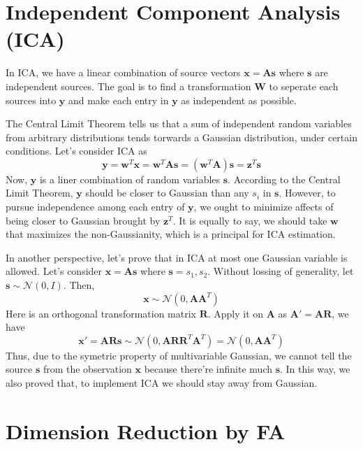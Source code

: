 \documentclass{article}
\begin{document}
\section{Independent Component Analysis (ICA)}
\par
In ICA, we have a linear combination of source vectors $\mathbf{x}=\mathbf{As}$ where $\mathbf{s}$ are independent sources. The goal is to find a transformation $\mathbf{W}$ to seperate each sources into $\mathbf{y}$ and make each entry in $\mathbf{y}$ as independent as possible.
\par
The Central Limit Theorem tells us that a sum of independent random variables from arbitrary distributions tends torwards a Gaussian distribution, under certain conditions.
Let's consider ICA as
\begin{equation}
  \mathbf{y}=\mathbf{w}^T\mathbf{x}=\mathbf{w}^T\mathbf{As}=(\mathbf{w}^T\mathbf{A})\mathbf{s}=\mathbf{z}^T\mathbf{s}
\end{equation}
Now, $\mathbf{y}$ is a liner combination of random variables $\mathbf{s}$. According to the Central Limit Theorem, $\mathbf{y}$ should be closer to Gaussian than any $s_i$ in $\mathbf{s}$. However, to pursue independence among each entry of $\mathbf{y}$,
we ought to minimize affects of being closer to Gaussian brought by $\mathbf{z}^T$. It is equally to say, we should take $\mathbf{w}$ that maximizes the non-Gaussianity, which is a principal for ICA estimation.
\par
In another perspective, let's prove that in ICA at most one Gaussian variable is allowed. Let's consider $\mathbf{x}=\mathbf{As}$ where $\mathbf{s}={s_1,s_2}$. Without lossing of generality, let $\mathbf{s}\sim\mathcal{N}(0, I)$. Then, 
\begin{equation}
  \mathbf{x}\sim\mathcal{N}(0, \mathbf{AA}^T)
\end{equation}
Here is an orthogonal transformation matrix $\mathbf{R}$. Apply it on $\mathbf{A}$ as $\mathbf{A'}=\mathbf{AR}$, we have
\begin{equation}
  \mathbf{x'}=\mathbf{ARs}\sim\mathcal{N}(0, \mathbf{AR}\mathbf{R}^T\mathbf{A}^T)=\mathcal{N}(0, \mathbf{AA}^T)
\end{equation}
Thus, due to the symetric property of multivariable Gaussian, we cannot tell the source $\mathbf{s}$ from the observation $\mathbf{x}$ because there're infinite much $\mathbf{s}$. In this way, we also proved that, to implement ICA we should stay away from Gaussian.
\section{Dimension Reduction by FA}
\end{document}
